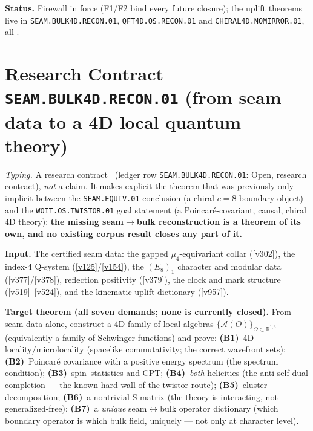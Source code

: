 \documentclass[11pt,a4paper]{article}
\begin{document}
\par\smallskip\noindent\textbf{Status.} Firewall in force (F1/F2 bind every future closure);
the uplift theorems live in \texttt{SEAM.BULK4D.RECON.01}, \texttt{QFT4D.OS.RECON.01} and
\texttt{CHIRAL4D.NOMIRROR.01}, all \mO.

\section*{Research Contract --- \texttt{SEAM.BULK4D.RECON.01} (from seam data to a 4D local quantum theory)}
\noindent\emph{Typing.} A research contract \mO\ (ledger row \texttt{SEAM.BULK4D.RECON.01}:
Open, research contract), \emph{not} a claim.  It makes explicit the theorem that was previously
only implicit between the \texttt{SEAM.EQUIV.01} conclusion (a chiral $c{=}8$ boundary object)
and the \texttt{WOIT.OS.TWISTOR.01} goal statement (a Poincar\'e-covariant, causal, chiral 4D
theory): \textbf{the missing seam$\to$bulk reconstruction is a theorem of its own, and no
existing corpus result closes any part of it.}

\par\smallskip\noindent\textbf{Input.} The certified seam data: the gapped $\mu_4$-equivariant
collar (\vref{v302}), the index-4 Q-system (\vref{v125}/\vref{v154}), the $(E_8)_1$ character
and modular data (\vref{v377}/\vref{v378}), reflection positivity (\vref{v379}), the clock and
mark structure (\vref{v519}--\vref{v524}), and the kinematic uplift dictionary (\vref{v957}).

\par\smallskip\noindent\textbf{Target theorem (all seven demands; none is currently closed).}
From seam data alone, construct a 4D family of local algebras
$\{\mathcal A(O)\}_{O\subset\mathbb R^{1,3}}$ (equivalently a family of Schwinger functions) and
prove:
\textbf{(B1)}~4D locality/microlocality (spacelike commutativity; the correct wavefront sets);
\textbf{(B2)}~Poincar\'e covariance with a positive energy spectrum (the spectrum condition);
\textbf{(B3)}~spin--statistics and CPT;
\textbf{(B4)}~\emph{both} helicities (the anti-self-dual completion --- the known hard wall of
the twistor route);
\textbf{(B5)}~cluster decomposition;
\textbf{(B6)}~a nontrivial S-matrix (the theory is interacting, not generalized-free);
\textbf{(B7)}~a \emph{unique} seam$\leftrightarrow$bulk operator dictionary (which boundary
operator is which bulk field, uniquely --- not only at character level).
\end{document}
